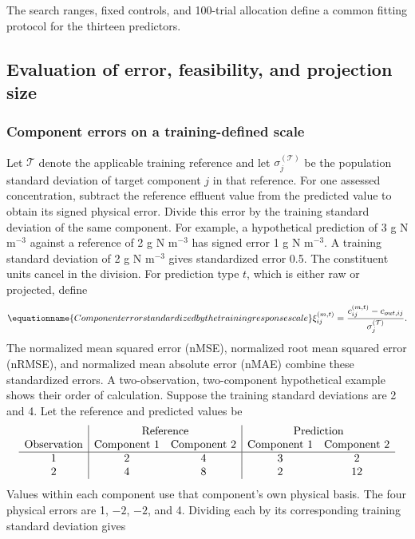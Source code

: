 The search ranges, fixed controls, and 100-trial allocation define a common fitting protocol for the thirteen predictors.

\subsection{Evaluation of error, feasibility, and projection size}

\subsubsection{Component errors on a training-defined scale}

Let $\mathcal{T}$ denote the applicable training reference and let $\sigma_j^{(\mathcal{T})}$ be the population standard deviation of target component $j$ in that reference. For one assessed concentration, subtract the reference effluent value from the predicted value to obtain its signed physical error. Divide this error by the training standard deviation of the same component. For example, a hypothetical prediction of 3 g N m$^{-3}$ against a reference of 2 g N m$^{-3}$ has signed error 1 g N m$^{-3}$. A training standard deviation of 2 g N m$^{-3}$ gives standardized error 0.5. The constituent units cancel in the division. For prediction type $t$, which is either raw or projected, define
\begin{equation}
\equationname{Component error standardized by the training response scale}
\xi_{ij}^{(m,t)}=
\frac{c_{ij}^{(m,t)}-c_{out,ij}}{\sigma_j^{(\mathcal{T})}}.
\label{eq:projection_standardized_error}
\end{equation}
The normalized mean squared error (nMSE), normalized root mean squared error (nRMSE), and normalized mean absolute error (nMAE) combine these standardized errors. A two-observation, two-component hypothetical example shows their order of calculation. Suppose the training standard deviations are 2 and 4. Let the reference and predicted values be
\[
\begin{array}{c|cc|cc}
&\multicolumn{2}{c|}{\text{Reference}}&\multicolumn{2}{c}{\text{Prediction}}\\
\text{Observation}&\text{Component 1}&\text{Component 2}&\text{Component 1}&\text{Component 2}\\\hline
1&2&4&3&2\\
2&4&8&2&12
\end{array}
\]
Values within each component use that component's own physical basis. The four physical errors are 1, $-2$, $-2$, and 4. Dividing each by its corresponding training standard deviation gives
